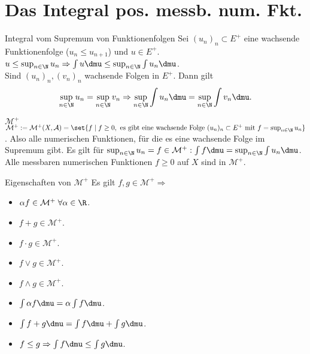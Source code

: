 \section*{Das Integral pos. messb. num. Fkt.}

\begin{karte}{Integral vom Supremum von Funktionenfolgen}
	Sei \( (u_n)_n \subset E^+ \) eine wachsende Funktionenfolge 
	(\(u_n \leq u_{n+1}\)) und \(u \in E^+\).\\
	\( u \leq \sup_{n\in\N} u_n \Rightarrow \int u \dmu 
	\leq \sup_{n\in\N} \int u_n \dmu \).\\
	Sind \( (u_n)_n, (v_n)_n \) wachsende Folgen in \(E^+\). Dann gilt 
	\[ \sup_{n\in\N} u_n = \sup_{n\in\N} v_n \Rightarrow 
	\sup_{n\in\N} \int u_n \dmu = \sup_{n\in\N} \int v_n \dmu. \]
\end{karte}

\begin{karte}{\( \mathcal{M}^+ \)}
	\( \mathcal{M}^+ := \mathcal{M}^+(X, \mathcal{A}) 
	= \set{f \;|\; f \geq 0, \text{ es gibt eine wachsende Folge } (u_n)_n \subset E^+ 
	\text{ mit } f = \sup_{n\in\N} u_n } \). Also alle numerischen Funktionen, für die es eine wachsende Folge im Supremum gibt.
	Es gilt für \( \sup_{n\in\N} u_n = f\in \mathcal{M}^+: \int f \dmu = \sup_{n\in\N} \int u_n \dmu \).\\
	Alle messbaren numerischen Funktionen \( f \geq 0 \) auf \(X\) sind in \( \mathcal{M}^+ \).
\end{karte}

\begin{karte}{Eigenschaften von \( \mathcal{M}^+ \)}
	Es gilt \( f,g \in \mathcal{M}^+ \Rightarrow \)
	\begin{itemize}
		\item \( \alpha f \in \mathcal{M}^+ \;\forall \alpha \in\R \).
		\item \( f + g \in \mathcal{M}^+ \).
		\item \( f \cdot g \in \mathcal{M}^+ \).
		\item \( f \vee g \in \mathcal{M}^+ \).
		\item \( f \wedge g \in \mathcal{M}^+ \).
		\item \( \int \alpha f \dmu 
		= \alpha \int f \dmu \).
		\item \( \int f+g \dmu 
		= \int f \dmu + \int g \dmu \).
		\item \( f \leq g \Rightarrow 
		\int f \dmu \leq \int g\dmu \).
	\end{itemize}
\end{karte}

